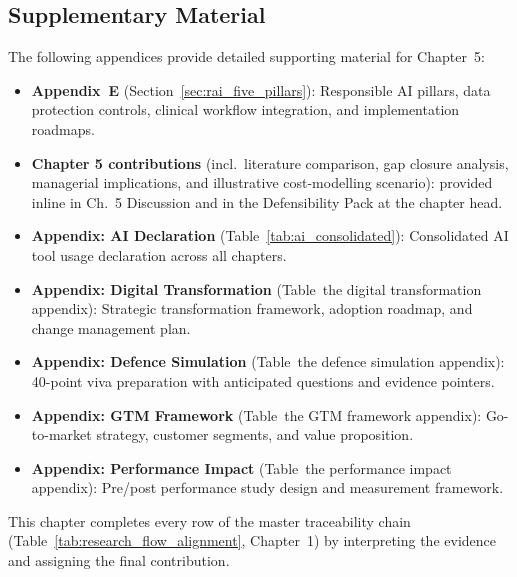 
\subsection{Supplementary Material}

The following appendices provide detailed supporting material for Chapter~5:
\begin{itemize}[leftmargin=*, itemsep=2pt]
\item \textbf{Appendix~E} (Section~\ref{sec:rai_five_pillars}): Responsible AI pillars, data protection controls, clinical workflow integration, and implementation roadmaps.
\item \textbf{Chapter 5 contributions} (incl.\ literature comparison, gap closure analysis, managerial implications, and illustrative cost-modelling scenario): provided inline in Ch.~5 Discussion and in the Defensibility Pack at the chapter head.
\item \textbf{Appendix: AI Declaration} (Table~\ref{tab:ai_consolidated}): Consolidated AI tool usage declaration across all chapters.
\item \textbf{Appendix: Digital Transformation} (Table~the digital transformation appendix): Strategic transformation framework, adoption roadmap, and change management plan.
\item \textbf{Appendix: Defence Simulation} (Table~the defence simulation appendix): 40-point viva preparation with anticipated questions and evidence pointers.
\item \textbf{Appendix: GTM Framework} (Table~the GTM framework appendix): Go-to-market strategy, customer segments, and value proposition.
\item \textbf{Appendix: Performance Impact} (Table~the performance impact appendix): Pre/post performance study design and measurement framework.
\end{itemize}


\noindent This chapter completes every row of the master traceability chain (Table~\ref{tab:research_flow_alignment}, Chapter~1) by interpreting the evidence and assigning the final contribution.


